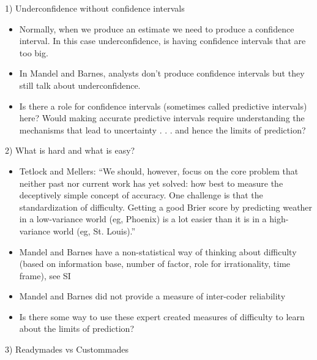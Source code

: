 \documentclass[aspectratio=169]{beamer}
\begin{document}
\begin{frame}

1) Underconfidence without confidence intervals \pause
\begin{itemize}
\item Normally, when we produce an estimate we need to produce a confidence interval.  In this case underconfidence, is having confidence intervals that are too big.
\pause
\item In Mandel and Barnes, analysts don't produce confidence intervals but they still talk about underconfidence.
\pause
\item Is there a role for confidence intervals (sometimes called predictive intervals) here? Would making accurate predictive intervals require understanding the mechanisms that lead to uncertainty  . . . and hence the limits of prediction?
\end{itemize}

\end{frame}
\begin{frame}

2) What is hard and what is easy? \pause
\begin{itemize}
\item Tetlock and Mellers: ``We should, however, focus on the core problem that neither past nor current work has yet solved: how best to measure the deceptively simple concept of accuracy. \pause One challenge is that the standardization of difficulty.  Getting a good Brier score by predicting weather in a low-variance world (eg, Phoenix) is a lot easier than it is in a high-variance world (eg, St. Louis).''
\pause
\item Mandel and Barnes have a non-statistical way of thinking about difficulty (based on information base, number of factor, role for irrationality, time frame), see SI
\pause 
\item Mandel and Barnes did not provide a measure of  inter-coder reliability
\pause
\item Is there some way to use these expert created measures of difficulty to learn about the limits of prediction?
\end{itemize}

\end{frame}
\begin{frame}

3) Readymades vs Custommades

\end{frame}
\end{document}
